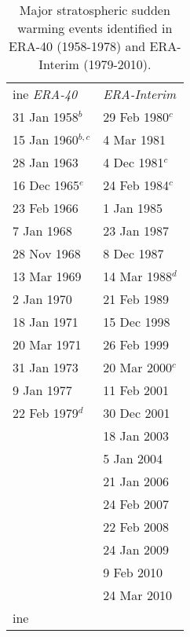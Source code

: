 \documentclass[draft,jgrga]{agutex}
\begin{document}
\begin{table}
\caption{Major stratospheric sudden warming events identified in ERA-40 (1958-1978) and ERA-Interim (1979-2010).}\centering
\begin{tabular}{l|l}
 ine
\textit{ERA-40}			& \textit{ERA-Interim}		\\
31 Jan 1958$^b$		&	29 Feb 1980$^{c}$		\\
15 Jan 1960$^{b,c}$	&	4 Mar 1981			\\
28 Jan 1963		&		4 Dec 1981$^{c}$		\\
16 Dec 1965$^{e}$	&		24 Feb 1984$^{c}$		\\
23 Feb 1966		&		1 Jan 1985			\\
7 Jan 1968		&		23 Jan 1987		\\
28 Nov 1968		&		8 Dec 1987			\\
13 Mar 1969 		&		14 Mar 1988$^d$			\\
2 Jan 1970		&		21 Feb 1989			\\
18 Jan 1971		&		15 Dec 1998			\\
20 Mar 1971 		&		26 Feb 1999			\\
31 Jan 1973		&		20 Mar 2000$^{c}$		\\
9 Jan 1977		&		11 Feb 2001			\\
22 Feb 1979$^{d}$	&		30 Dec 2001			\\

					&	18 Jan 2003	 	\\
			&	5  Jan 2004	 		\\
			&	21 Jan 2006	 		\\
			&	24 Feb 2007	 		\\
			&	22 Feb 2008	 		\\
 			&	24 Jan 2009			\\
 			&	9 Feb 2010	 			\\
			&	24 Mar 2010			\\
 ine
\end{tabular}
\label{tab:warmings}
\end{table}
\end{document}
